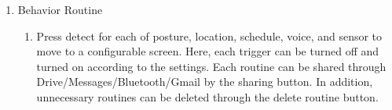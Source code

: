 \begin{enumerate}[label=\arabic*.]
    \item {\large{Behavior Routine}}
          \begin{enumerate}[label*={\arabic*.},ref=\theenumi.\arabic*]
              \setlength{\itemindent}{0.5cm}
              \item
                    Press detect for each of posture, location, schedule, voice, and sensor to move to a configurable screen. Here, each trigger can be turned off and turned on according to the settings. Each routine can be shared through Drive/Messages/Bluetooth/Gmail by the sharing button. In addition, unnecessary routines can be deleted through the delete routine button.\\\\


\end{enumerate}
\end{enumerate}
